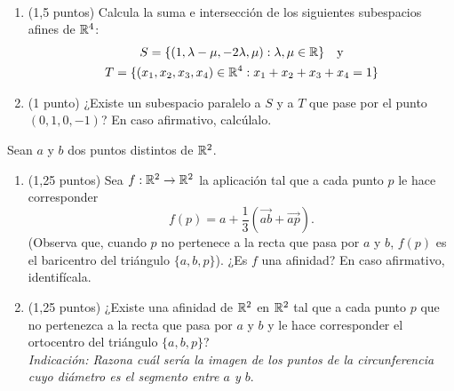 \documentclass[12pt]{article}
\begin{document}
    \begin{ejercicio}[2,5 puntos]~
        \begin{enumerate}
            \item (1,5 puntos) Calcula la suma e intersección de los siguientes subespacios afines de $\mathbb{R}^4$:
            \begin{gather*}
                S=\{(1,\lambda - \mu , -2\lambda, \mu) : \lambda, \mu \in \mathbb{R}\} \ \ \text{ y}\\
                T=\{(x_1,x_2,x_3,x_4)\in \mathbb{R}^4 : x_1+x_2+x_3+x_4=1\}
            \end{gather*}

            \item (1 punto) ¿Existe un subespacio paralelo a $S$ y a $T$ que pase por el punto $(0,1,0,-1)$? En caso afirmativo, calcúlalo.
        \end{enumerate}
        
    \end{ejercicio}

    \begin{ejercicio}[2,5 puntos]
        Sean $a$ y $b$ dos puntos distintos de $\mathbb{R}^2$. 
        \begin{enumerate}
            \item (1,25 puntos) Sea $f:\mathbb{R}^2 \rightarrow \mathbb{R}^2$ la aplicación tal que a cada punto $p$ le hace corresponder
            \[
                f(p)=a + \dfrac{1}{3}\left(\vec{ab}+\vec{ap}\right).
            \]
            (Observa que, cuando $p$ no pertenece a la recta que pasa por $a$ y $b$, $f(p)$ es el baricentro del triángulo $\{a,b,p\}$).
            ¿Es $f$ una afinidad? En caso afirmativo, identifícala.

            \item (1,25 puntos) ¿Existe una afinidad de $\mathbb{R}^2$ en $\mathbb{R}^2$ tal que a cada punto $p$ que no pertenezca a la recta que pasa por $a$ y $b$ y le hace corresponder el ortocentro del triángulo $\{a,b,p\}$?\\
            \textit{Indicación: Razona cuál sería la imagen de los puntos de la circunferencia cuyo diámetro es el segmento entre $a$ y $b$}.
        \end{enumerate}
    \end{ejercicio}
\end{document}
